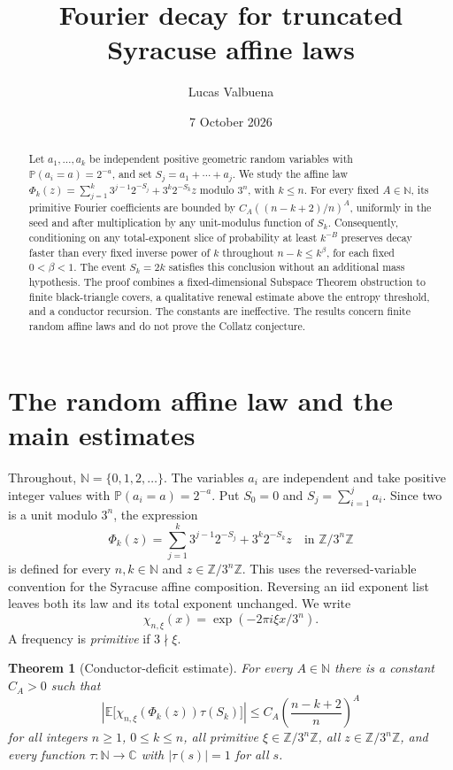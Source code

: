 \documentclass[11pt,a4paper]{article}
\title{Fourier decay for truncated Syracuse affine laws}
\author{Lucas Valbuena}
\date{7 October 2026}
\newtheorem{theorem}{Theorem}
\newcommand{\N}{\mathbb N}
\newcommand{\Z}{\mathbb Z}
\newcommand{\C}{\mathbb C}
\newcommand{\E}{\mathbb E}
\newcommand{\PP}{\mathbb P}
\newcommand{\abs}[1]{\left|#1\right|}
\begin{document}
\maketitle
\begin{abstract}
Let \(a_1,\ldots,a_k\) be independent positive geometric random variables
with \(\PP(a_i=a)=2^{-a}\), and set \(S_j=a_1+\cdots+a_j\).
We study the affine law
\(\Phi_k(z)=\sum_{j=1}^k3^{j-1}2^{-S_j}+3^k2^{-S_k}z\)
modulo \(3^n\), with \(k\le n\).
For every fixed \(A\in\N\), its primitive Fourier coefficients are bounded
by \(C_A((n-k+2)/n)^A\), uniformly in the seed and after multiplication
by any unit-modulus function of \(S_k\).
Consequently, conditioning on any total-exponent slice of probability at
least \(k^{-B}\) preserves decay faster than every fixed inverse power of
\(k\) throughout \(n-k\le k^\beta\), for each fixed \(0<\beta<1\).
The event \(S_k=2k\) satisfies this conclusion without an additional mass
hypothesis. The proof combines a fixed-dimensional Subspace Theorem
obstruction to finite black-triangle covers, a qualitative renewal
estimate above the entropy threshold, and a conductor recursion.
The constants are ineffective. The results concern finite random affine
laws and do not prove the Collatz conjecture.
\end{abstract}

\section{The random affine law and the main estimates}

Throughout, \(\N=\{0,1,2,\ldots\}\). The variables \(a_i\) are independent
and take positive integer values with \(\PP(a_i=a)=2^{-a}\).
Put \(S_0=0\) and \(S_j=\sum_{i=1}^ja_i\). Since two is a unit modulo
\(3^n\), the expression
\begin{equation}\label{eq:affine}
 \Phi_k(z)=\sum_{j=1}^k3^{j-1}2^{-S_j}+3^k2^{-S_k}z
 \quad\text{in }\Z/3^n\Z
\end{equation}
is defined for every \(n,k\in\N\) and \(z\in\Z/3^n\Z\).
This uses the reversed-variable convention for the Syracuse affine
composition. Reversing an iid exponent list leaves both its law and its
total exponent unchanged. We write
\[
 \chi_{n,\xi}(x)=\exp(-2\pi i\xi x/3^n).
\]
A frequency is \emph{primitive} if \(3\nmid\xi\).

\begin{theorem}[Conductor-deficit estimate]\label{thm:main}
For every \(A\in\N\) there is a constant \(C_A>0\) such that
\begin{equation}\label{eq:main}
 \abs{\E\bigl[\chi_{n,\xi}(\Phi_k(z))\tau(S_k)\bigr]}
 \le C_A\left(\frac{n-k+2}{n}\right)^A
\end{equation}
for all integers \(n\ge1\), \(0\le k\le n\), all primitive
\(\xi\in\Z/3^n\Z\), all \(z\in\Z/3^n\Z\), and every function
\(\tau:\N\to\C\) with \(\abs{\tau(s)}=1\) for all \(s\).
\end{theorem}
\end{document}
